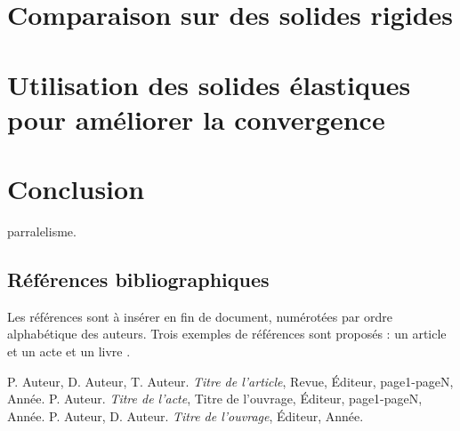 \documentclass{CSMA2017}
\begin{document}
\section{Comparaison sur des solides rigides}

\section{Utilisation des solides élastiques pour améliorer la convergence}

\section{Conclusion}

parralelisme.
\subsection{Références bibliographiques}

Les références sont à insérer en fin de document, numérotées par ordre alphabétique des auteurs. Trois exemples de références sont proposés : un article \cite{article} et un acte \cite{acte} et un livre  \cite{livre}.


\begin{thebibliography}{1}
P. Auteur, D. Auteur, T. Auteur. \emph{Titre de l'article}, Revue, Éditeur, page1-pageN, Année. 
 P. Auteur. \emph{Titre de l'acte}, Titre de l'ouvrage, Éditeur, page1-pageN, Année.
 P. Auteur, D. Auteur. \emph{Titre de l'ouvrage}, Éditeur, Année. 

\end{thebibliography}

\end{document}
